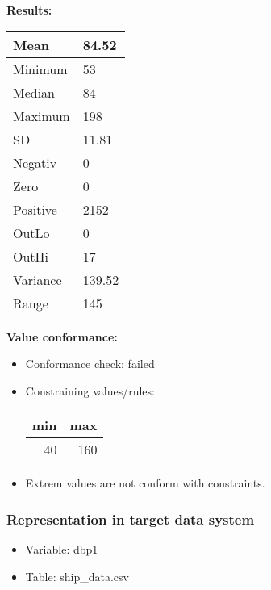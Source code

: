 \documentclass[
]{article}
\providecommand{\tightlist}{%
  \setlength{\itemsep}{0pt}\setlength{\parskip}{0pt}}
\begin{document}
\textbf{Results:}\\

\begin{table}[H]
\centering
\begin{tabular}{l|l}
\hline
Mean & 84.52\\
\hline
Minimum & 53\\
\hline
Median & 84\\
\hline
Maximum & 198\\
\hline
SD & 11.81\\
\hline
Negativ & 0\\
\hline
Zero & 0\\
\hline
Positive & 2152\\
\hline
OutLo & 0\\
\hline
OutHi & 17\\
\hline
Variance & 139.52\\
\hline
Range & 145\\
\hline
\end{tabular}
\end{table}

\textbf{Value conformance:}

\begin{itemize}
\tightlist
\item
  Conformance check: failed
\item
  Constraining values/rules:

  \begin{table}[H]
  \centering
  \begin{tabular}{r|r}
  \hline
  \textbf{min} & \textbf{max}\\
  \hline
  40 & 160\\
  \hline
  \end{tabular}
  \end{table}
\item
  Extrem values are not conform with constraints.
\end{itemize}

\newpage

\hypertarget{representation-in-target-data-system-3}{%
\subsubsection{\texorpdfstring{Representation in \textbf{target} data
system}{Representation in target data system}}\label{representation-in-target-data-system-3}}

\begin{itemize}
\tightlist
\item
  Variable: dbp1
\item
  Table: ship\_data.csv
\end{itemize}
\end{document}
